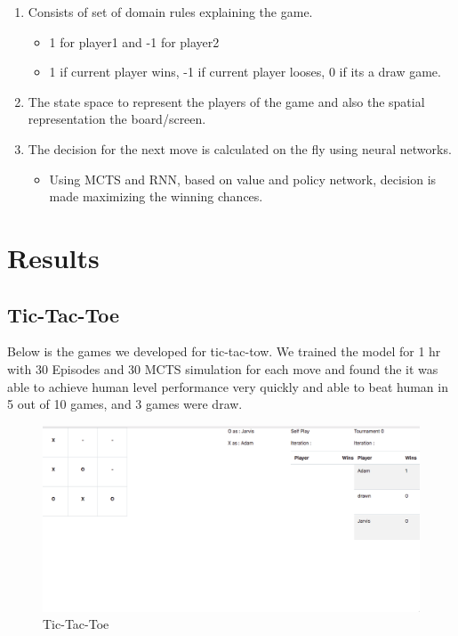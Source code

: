 \documentclass{article}
\begin{document}
\begin{enumerate}
    \item Consists of set of domain rules explaining the game.
        \begin{itemize}
            \item 1 for player1 and -1 for player2
            \item 1 if current player wins, -1 if current player looses, 0 if its a draw game.
        \end{itemize}
    \item The state space to represent the players of the game and also the spatial
representation the board/screen.
    
    \item The decision for the next move is calculated on the fly using neural networks.
        \begin{itemize}
            \item Using MCTS and RNN, based on value and policy network, decision is made maximizing the winning chances.
        \end{itemize}
\end{enumerate}

\section{Results}
\subsection{Tic-Tac-Toe}

Below is the games we developed for tic-tac-tow. We trained the model for 1 hr with 30 Episodes and 30 MCTS simulation for each move and found the it was able to achieve human level performance very quickly and able to beat human in 5 out of 10 games, and 3 games were draw.
\begin{figure}
    \centering
    \includegraphics[width=\textwidth,scale=0.5]{tictactoe.png}
    \caption{Tic-Tac-Toe}
    \label{fig:my_label}
\end{figure}
\end{document}
